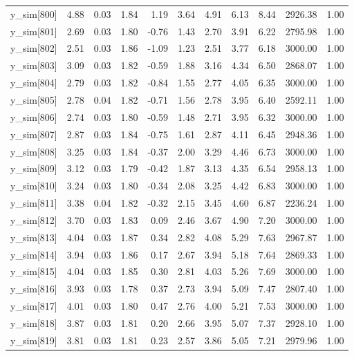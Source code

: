 \begin{table}[ht]
\begin{tabular}{rrrrrrrrrrr}
  y\_sim[800] & 4.88 & 0.03 & 1.84 & 1.19 & 3.64 & 4.91 & 6.13 & 8.44 & 2926.38 & 1.00 \\ 
  y\_sim[801] & 2.69 & 0.03 & 1.80 & -0.76 & 1.43 & 2.70 & 3.91 & 6.22 & 2795.98 & 1.00 \\ 
  y\_sim[802] & 2.51 & 0.03 & 1.86 & -1.09 & 1.23 & 2.51 & 3.77 & 6.18 & 3000.00 & 1.00 \\ 
  y\_sim[803] & 3.09 & 0.03 & 1.82 & -0.59 & 1.88 & 3.16 & 4.34 & 6.50 & 2868.07 & 1.00 \\ 
  y\_sim[804] & 2.79 & 0.03 & 1.82 & -0.84 & 1.55 & 2.77 & 4.05 & 6.35 & 3000.00 & 1.00 \\ 
  y\_sim[805] & 2.78 & 0.04 & 1.82 & -0.71 & 1.56 & 2.78 & 3.95 & 6.40 & 2592.11 & 1.00 \\ 
  y\_sim[806] & 2.74 & 0.03 & 1.80 & -0.59 & 1.48 & 2.71 & 3.95 & 6.32 & 3000.00 & 1.00 \\ 
  y\_sim[807] & 2.87 & 0.03 & 1.84 & -0.75 & 1.61 & 2.87 & 4.11 & 6.45 & 2948.36 & 1.00 \\ 
  y\_sim[808] & 3.25 & 0.03 & 1.84 & -0.37 & 2.00 & 3.29 & 4.46 & 6.73 & 3000.00 & 1.00 \\ 
  y\_sim[809] & 3.12 & 0.03 & 1.79 & -0.42 & 1.87 & 3.13 & 4.35 & 6.54 & 2958.13 & 1.00 \\ 
  y\_sim[810] & 3.24 & 0.03 & 1.80 & -0.34 & 2.08 & 3.25 & 4.42 & 6.83 & 3000.00 & 1.00 \\ 
  y\_sim[811] & 3.38 & 0.04 & 1.82 & -0.32 & 2.15 & 3.45 & 4.60 & 6.87 & 2236.24 & 1.00 \\ 
  y\_sim[812] & 3.70 & 0.03 & 1.83 & 0.09 & 2.46 & 3.67 & 4.90 & 7.20 & 3000.00 & 1.00 \\ 
  y\_sim[813] & 4.04 & 0.03 & 1.87 & 0.34 & 2.82 & 4.08 & 5.29 & 7.63 & 2967.87 & 1.00 \\ 
  y\_sim[814] & 3.94 & 0.03 & 1.86 & 0.17 & 2.67 & 3.94 & 5.18 & 7.64 & 2869.33 & 1.00 \\ 
  y\_sim[815] & 4.04 & 0.03 & 1.85 & 0.30 & 2.81 & 4.03 & 5.26 & 7.69 & 3000.00 & 1.00 \\ 
  y\_sim[816] & 3.93 & 0.03 & 1.78 & 0.37 & 2.73 & 3.94 & 5.09 & 7.47 & 2807.40 & 1.00 \\ 
  y\_sim[817] & 4.01 & 0.03 & 1.80 & 0.47 & 2.76 & 4.00 & 5.21 & 7.53 & 3000.00 & 1.00 \\ 
  y\_sim[818] & 3.87 & 0.03 & 1.81 & 0.20 & 2.66 & 3.95 & 5.07 & 7.37 & 2928.10 & 1.00 \\ 
  y\_sim[819] & 3.81 & 0.03 & 1.81 & 0.23 & 2.57 & 3.86 & 5.05 & 7.21 & 2979.96 & 1.00 \\ 

\end{tabular}
\end{table}
